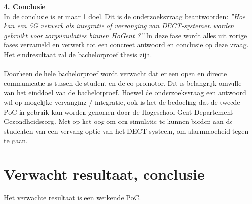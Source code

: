 \textbf{4. Conclusie}\\
In de conclusie is er maar 1 doel. Dit is de onderzoeksvraag beantwoorden: \textit{''Hoe kan een 5G netwerk als integratie of vervanging van DECT-systemen worden gebruikt voor zorgsimulaties binnen HoGent ?''} In deze fase wordt alles uit vorige fases verzameld en verwerk tot een concreet antwoord en conclusie op deze vraag. Het eindresultaat zal de bachelorproef thesis zijn.
\\\\
Doorheen de hele bachelorproef wordt verwacht dat er een open en directe communicatie is tussen de student en de co-promotor. Dit is belangrijk omwille van het einddoel van de bachelorproef. Hoewel de onderzoeksvraag een antwoord wil op mogelijke vervanging / integratie, ook is het de bedoeling dat de tweede PoC in gebruik kan worden genomen door de Hogeschool Gent Departement Gezondheidszorg. Met op het oog om een simulatie te kunnen bieden aan de studenten van een vervang optie van het DECT-systeem, om alarmmoeheid tegen te gaan.

\section{Verwacht resultaat, conclusie}%
\label{sec:verwachte_resultaten}

Het verwachte resultaat is een werkende PoC.